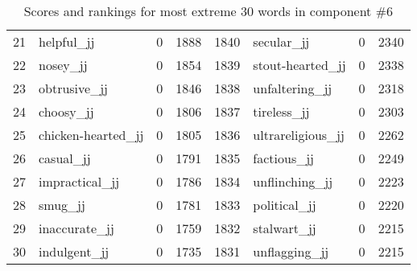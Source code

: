 \begin{table}[tbp]
\begin{tabular}{| rlr@{.}l | rlr@{.}l |}
    21 & helpful\_jj & 0 & 1888    &    1840 & secular\_jj & 0 & 2340 \\
    22 & nosey\_jj & 0 & 1854    &    1839 & stout-hearted\_jj & 0 & 2338 \\
    23 & obtrusive\_jj & 0 & 1846    &    1838 & unfaltering\_jj & 0 & 2318 \\
    24 & choosy\_jj & 0 & 1806    &    1837 & tireless\_jj & 0 & 2303 \\
    25 & chicken-hearted\_jj & 0 & 1805    &    1836 & ultrareligious\_jj & 0 & 2262 \\
    26 & casual\_jj & 0 & 1791    &    1835 & factious\_jj & 0 & 2249 \\
    27 & impractical\_jj & 0 & 1786    &    1834 & unflinching\_jj & 0 & 2223 \\
    28 & smug\_jj & 0 & 1781    &    1833 & political\_jj & 0 & 2220 \\
    29 & inaccurate\_jj & 0 & 1759    &    1832 & stalwart\_jj & 0 & 2215 \\
    30 & indulgent\_jj & 0 & 1735    &    1831 & unflagging\_jj & 0 & 2215 \\
    \hline
    \end{tabular}
    \caption{Scores and rankings for most extreme 30 words in component \#6} 
\end{table}
\clearpage
